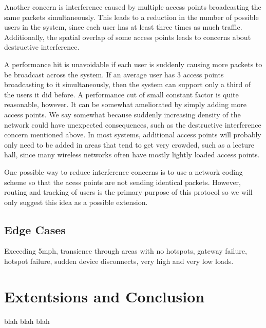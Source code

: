 \documentclass[letterpaper,12pt]{article}
\begin{document}
Another concern is interference caused by multiple access points broadcasting 
the same packets simultaneously. This leads to a reduction in the number
of possible users in the system, since each user has at least three times
as much traffic. Additionally, the spatial overlap of some access points leads
to concerns about destructive interference. 

A performance hit is unavoidable if each user is suddenly causing more packets
to be broadcast across the system. If an average  user has 3 access points
broadcasting to it simultaneously, then the system can support only a third of
the users it did before. A performance cut of small constant factor is quite
reasonable, however. It can be somewhat ameliorated by simply adding more access 
points. We say somewhat because suddenly increasing density of the network could
have unexpected consequences, such as the destructive interference concern 
mentioned above. In most systems, additional access points will probably only
need to be added in areas that tend to get very crowded, such as a lecture hall,
since many wireless networks often have mostly lightly loaded access points.

One possible way to reduce interference concerns is to use a network coding 
scheme so that the acess points are not sending identical packets. However,
routing and tracking of users is the primary purpose of this protocol so 
we will only suggest this idea as a possible extension.

\subsection{Edge Cases}
Exceeding 5mph, transience through areas with no hotspots, gateway failure, 
hotspot failure, sudden device disconnects, very high and very low loads.

\section{Extentsions and Conclusion}
blah blah blah

{\footnotesize 
}
\end{document}
